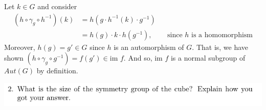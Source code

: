 \documentclass[12pt,letterpaper,boxed]{hmcpset}
\newcommand{\im}{\text{im }}
\newcommand{\inv}{^{-1}}
\begin{document}
\begin{solution}
\begin{enumerate}
	Let $k \in G$ and consider 
	\begin{align*}
		(h \circ \gamma_g \circ h\inv)(k) &= h(g \cdot h\inv(k) \cdot g\inv) \\
			&= h(g) \cdot k \cdot h(g\inv), && \text{since $h$ is a homomorphism}
	\end{align*}
	Moreover, $h(g) = g' \in G$ since $h$ is an automorphism of $G$.
	That is, we have shown $(h \circ \gamma_g \circ g\inv) = f(g') \in
	\im f$. And so, $\im f$ is a normal subgroup of $Aut(G)$ by
	definition.

\end{enumerate}
\end{solution}

\newpage


\begin{problem}
	\includegraphics[scale=0.8]{2.png}
	\hfill
\end{problem}
\end{document}
